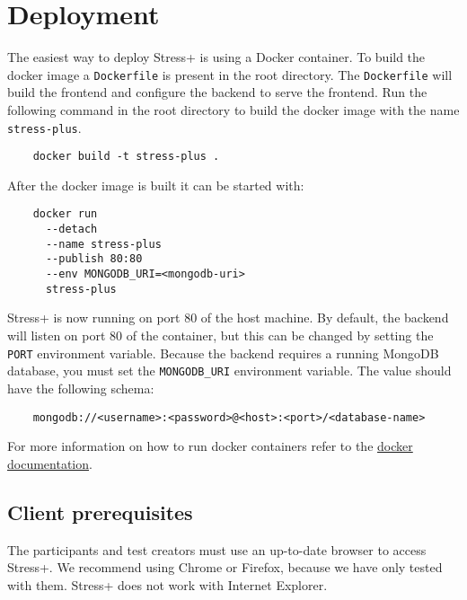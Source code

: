 \section{Deployment}
\label{sec:deployment}

The easiest way to deploy Stress+ is using a Docker container.
To build the docker image a \texttt{Dockerfile} is present in the root directory. 
The \texttt{Dockerfile} will build the frontend and configure the backend to serve the frontend. 
Run the following command in the root directory to build the docker image with the name \texttt{stress-plus}.
\begin{verbatim}
    docker build -t stress-plus .
\end{verbatim}
After the docker image is built it can be started with:
\begin{verbatim}
    docker run 
      --detach 
      --name stress-plus 
      --publish 80:80 
      --env MONGODB_URI=<mongodb-uri> 
      stress-plus
\end{verbatim}
Stress+ is now running on port $80$ of the host machine.
By default, the backend will listen on port $80$ of the container, but this can be changed by setting the \texttt{PORT} environment variable.
Because the backend requires a running MongoDB database, you must set the \texttt{MONGODB\_URI} environment variable. 
The value should have the following schema:
\begin{verbatim}
    mongodb://<username>:<password>@<host>:<port>/<database-name>
\end{verbatim}

For more information on how to run docker containers refer to the \href{https://docs.docker.com/engine/reference/commandline/run}{docker documentation}.

\subsection*{Client prerequisites}
The participants and test creators must use an up-to-date browser to access Stress+.
We recommend using Chrome or Firefox, because we have only tested with them.
Stress+ does not work with Internet Explorer.
